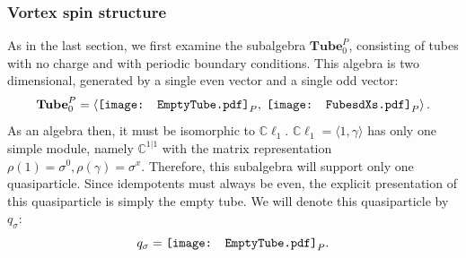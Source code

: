\documentclass[12pt,a4paper]{article}
\newcommand{\cc}{\mathbb{C}}
\newcommand\be            {\begin{equation}}
\newcommand\ee            {\end{equation}}
\newcommand{\cl}{\mathbb{C}\ell}
\newcommand{\fube}{\textbf{Tube}}
\newcommand{\tube}{\textbf{Tube}}
\newcommand{\fld}{\mathcal{F}} %
\newcommand{\FubeXXX}{\mathord{\vcenter{\hbox{\texttt{[image: EmptyTube.pdf]}}}}}
\newcommand{\FubesdXs}{\mathord{\vcenter{\hbox{\texttt{[image: FubesdXs.pdf]}}}}}
\begin{document}
\subsubsection{Vortex spin structure} 

As in the last section, we first examine the subalgebra $\tube^P_0$, consisting of tubes with no charge and with periodic boundary conditions.
 This algebra is two dimensional, generated by a single even vector and a single odd vector: 
\be \tube^P_0 = \left\langle \FubeXXX_P,\; \FubesdXs_P\right\rangle.\ee
As an algebra then, it must be isomorphic to $\cl_1$. 
$\cl_1 = \langle 1,\gamma\rangle$ has only one simple module, namely $\cc^{1|1}$ with the matrix representation $\rho(1) = \sigma^0,\rho(\gamma)=\sigma^x$. Therefore, this subalgebra will support only one quasiparticle. Since idempotents must always be even, the explicit presentation of this quasiparticle is simply the empty tube. We will denote this quasiparticle by $q_\sigma$:
\be q_\sigma = \FubeXXX_P.\ee
\end{document}
